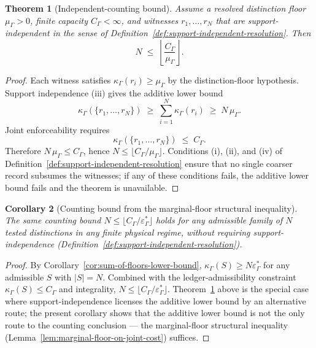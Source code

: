 \documentclass[11pt]{article}
\newtheorem{theorem}{Theorem}[section]
\newtheorem{corollary}[theorem]{Corollary}
\begin{document}
\begin{theorem}[Independent-counting bound]\label{thm:independent-counting-bound-formal}
Assume a resolved distinction floor $\mu_\Gamma>0$, finite capacity
$C_\Gamma<\infty$, and witnesses $r_1,\ldots,r_N$ that are
support-independent in the sense of
Definition~\ref{def:support-independent-resolution}.  Then
\[
    N\;\le\;\left\lfloor \frac{C_\Gamma}{\mu_\Gamma}\right\rfloor.
\]
\end{theorem}
\begin{proof}
Each witness satisfies $\kappa_\Gamma(r_i)\ge\mu_\Gamma$ by the
distinction-floor hypothesis.  Support independence (iii) gives the
additive lower bound
\[
    \kappa_\Gamma(\{r_1,\ldots,r_N\})
    \;\ge\;
    \sum_{i=1}^N\kappa_\Gamma(r_i)
    \;\ge\;
    N\,\mu_\Gamma.
\]
Joint enforceability requires
\[
    \kappa_\Gamma(\{r_1,\ldots,r_N\})\;\le\;C_\Gamma.
\]
Therefore $N\,\mu_\Gamma\le C_\Gamma$, hence
$N\le\lfloor C_\Gamma/\mu_\Gamma\rfloor$.  Conditions (i), (ii), and
(iv) of Definition~\ref{def:support-independent-resolution} ensure
that no single coarser record subsumes the witnesses; if any of these
conditions fails, the additive lower bound fails and the theorem is
unavailable.
\end{proof}

\begin{corollary}[Counting bound from the marginal-floor structural inequality]
\label{cor:counting-bound-from-marginal-floor}
The same counting bound $N\le\lfloor C_\Gamma/\varepsilon^*_\Gamma\rfloor$ holds for any admissible family of $N$ tested distinctions in any finite physical regime, without requiring support-independence (Definition~\ref{def:support-independent-resolution}).
\end{corollary}
\begin{proof}
By Corollary~\ref{cor:sum-of-floors-lower-bound}, $\kappa_\Gamma(S)\ge N\varepsilon^*_\Gamma$ for any admissible $S$ with $|S|=N$.  Combined with the ledger-admissibility constraint $\kappa_\Gamma(S)\le C_\Gamma$ and integrality, $N\le\lfloor C_\Gamma/\varepsilon^*_\Gamma\rfloor$.  Theorem~\ref{thm:independent-counting-bound-formal} above is the special case where support-independence licenses the additive lower bound by an alternative route; the present corollary shows that the additive lower bound is not the only route to the counting conclusion --- the marginal-floor structural inequality (Lemma~\ref{lem:marginal-floor-on-joint-cost}) suffices.
\end{proof}
\end{document}
